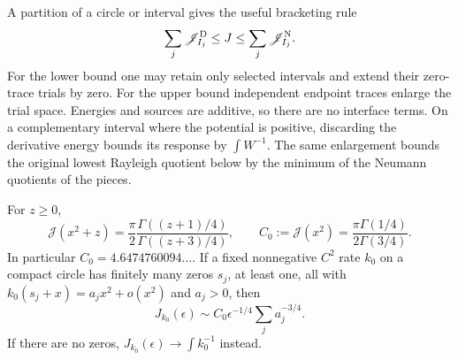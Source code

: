 A partition of a circle or interval gives the useful bracketing rule
\begin{equation}\label{eq:response-bracketing}
 \sum_j\mathscr J_{I_j}^{\rm D}\le J\le
 \sum_j\mathscr J_{I_j}^{\rm N}.
\end{equation}
For the lower bound one may retain only selected intervals and extend
their zero-trace trials by zero. For the upper bound independent endpoint
traces enlarge the trial space. Energies and sources are additive, so
there are no interface terms. On a complementary interval where the
potential is positive, discarding the derivative energy bounds its
response by $\int W^{-1}$. The same enlargement bounds the original
lowest Rayleigh quotient below by the minimum of the Neumann quotients
of the pieces.

\begin{proposition}
\label{prop:harmonic}
For $z\ge0$,
\begin{equation}\label{eq:harmonic-constant}
 \mathscr J(x^2+z)=\frac\pi2
     \frac{\Gamma((z+1)/4)}{\Gamma((z+3)/4)},\qquad
 C_0:=\mathscr J(x^2)=\frac{\pi\Gamma(1/4)}{2\Gamma(3/4)}.
\end{equation}
In particular $C_0=4.6474760094\ldots$. If a fixed nonnegative $C^2$
rate $k_0$ on a compact circle has finitely many zeros $s_j$, at least
one, all with
$k_0(s_j+x)=a_jx^2+o(x^2)$ and $a_j>0$, then
\begin{equation}\label{eq:isolated-harmonic}
 J_{k_0}(\epsilon)\sim C_0\epsilon^{-1/4}\sum_j a_j^{-3/4}.
\end{equation}
If there are no zeros, $J_{k_0}(\epsilon)\to\int k_0^{-1}$ instead.
\end{proposition}
